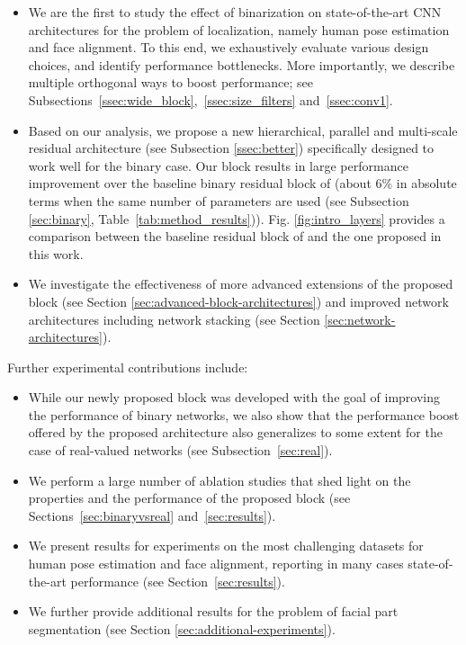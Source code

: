 \documentclass[10pt,journal,compsoc]{IEEEtran}
\begin{document}
\begin{itemize}\item
          We are the first to study the effect of binarization on state-of-the-art CNN architectures for the problem of localization, namely human pose estimation and face alignment. To this end, we exhaustively evaluate various design choices, and identify performance bottlenecks. More importantly, we describe multiple orthogonal ways to boost performance; see Subsections~\ref{ssec:wide_block},~\ref{ssec:size_filters} and~\ref{ssec:conv1}.
    \item
          Based on our analysis, we propose a new hierarchical, parallel and multi-scale residual architecture (see Subsection \ref{ssec:better}) specifically designed to work well for the binary case. Our block results in large performance improvement over the baseline binary residual block of \cite{he2016identity} (about 6\% in absolute terms when the same number of parameters are used (see Subsection \ref{sec:binary}, Table~\ref{tab:method_results})). {\color{black} Fig. \ref{fig:intro_layers} provides a comparison between the baseline residual block of \cite{he2016identity} and the one proposed in this work.} \item 
         We investigate the effectiveness of more advanced extensions of the proposed block (see Section \ref{sec:advanced-block-architectures}) and improved network architectures  including network stacking (see Section \ref{sec:network-architectures}).  
\end{itemize}
Further experimental contributions include:
\begin{itemize}\item
          While our newly proposed block was developed with the goal of improving the performance of binary networks, we also show that the performance boost offered by the proposed architecture also generalizes to some extent for the case of real-valued networks (see Subsection~\ref{sec:real}).
    \item
          We perform a large number of ablation studies that shed light on the properties and the performance of the proposed block (see Sections~\ref{sec:binaryvsreal} and~\ref{sec:results}).
    \item
          We present results for experiments on the most challenging datasets for human pose estimation and face alignment, reporting in many cases state-of-the-art performance (see Section~\ref{sec:results}).
    \item
    	We further provide additional results for the problem of facial part segmentation (see Section \ref{sec:additional-experiments}).
\end{itemize}
\end{document}
